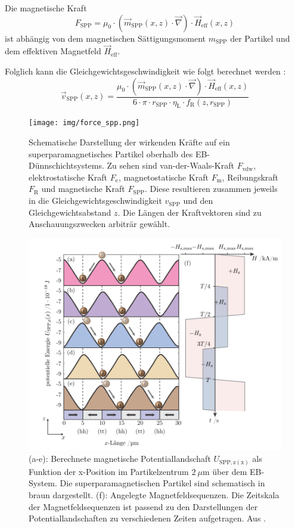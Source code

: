 \documentclass[page,pdftex,12pt,a4paper,twoside,openright]{scrbook}
\begin{document}
Die magnetische Kraft
\begin{equation}
F_\mathrm{SPP} = \mu_0 \cdot (\vec{m}_\mathrm{SPP}(x,z) \cdot \vec{\nabla}) \cdot \vec{H}_\mathrm{eff}(x,z)
\end{equation}
ist abhängig von dem magnetischen Sättigungsmoment \(m_\mathrm{SPP}\) der Partikel und dem effektiven Magnetfeld \(\vec{H}_\mathrm{eff}\).

Folglich kann die Gleichgewichtsgeschwindigkeit wie folgt berechnet werden \cite{holzinger_transport_2015}: 
\begin{equation}
\vec{v}_\mathrm{SPP} (x,z) =
\frac{ \mu_0 \cdot (\vec{m}_\mathrm{SPP}(x,z) \cdot \vec{\nabla}) \cdot \vec{H}_\mathrm{eff}(x,z)}
{6 \cdot \pi \cdot r_\mathrm{SPP} \cdot \eta_\mathrm{L} \cdot f_\mathrm{R}(z,r_\mathrm{SPP})}
\end{equation}

\begin{figure}[h]
\centering
\texttt{[image: img/force\_spp.png]}
\caption{\label{fig-force_spp}
Schematische Darstellung der wirkenden Kräfte auf ein superparamagnetisches Partikel oberhalb des EB-Dünnschichtsystems. Zu sehen sind van-der-Waals-Kraft \(F_\mathrm{vdw}\), elektrostatische Kraft \(F_\mathrm{e}\), magnetostatische Kraft \(F_\mathrm{m}\), Reibungskraft \(F_\mathrm{R}\) und magnetische Kraft \(F_\mathrm{SPP}\). Diese resultieren zusammen jeweils in die Gleichgewichtsgeschwindigkeit \(v_\mathrm{SPP}\) und den Gleichgewichtsabstand \(z\). Die Längen der Kraftvektoren sind zu Anschauungszwecken arbiträr gewählt.}
\end{figure}


\begin{figure}[h]
\centering
\includegraphics[width=\textwidth]{img/trapez.png}
\caption{\label{fig-transport}
(a-e): Berechnete magnetische Potentiallandschaft \(U_\mathrm{SPP,z(x)}\) als Funktion der x-Position im Partikelzentrum \(\SI{2}{\mu\meter}\) über dem EB-System. Die superparamagnetischen Partikel sind schematisch in braun dargestellt. (f): Angelegte Magnetfeldsequenzen. Die Zeitskala der Magnetfeldsequenzen ist passend zu den Darstellungen der Potentiallandschaften zu verschiedenen Zeiten aufgetragen. Aus \cite{holzinger_transport_2015}.}
\end{figure}
\end{document}
